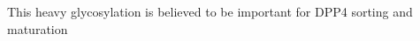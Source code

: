 This heavy glycosylation is believed to be important for DPP4 sorting and maturation\cite{Matter_1991}